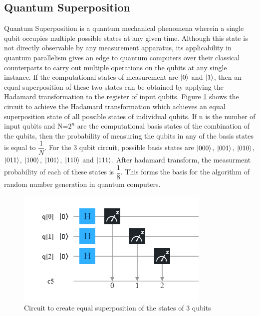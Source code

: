 \documentclass[english,a4paper,11pt,oneside,onecolumn]{book}
\begin{document}
\subsection{Quantum Superposition}
\label{sec:qSupPos}
Quantum Superposition is a quantum mechanical phenomena wherein a single qubit occupies multiple possible states at any given time. Although this state is not directly observable by any measurement apparatus, its applicability in quantum parallelism gives an edge to quantum computers over their classical counterparts to carry out multiple operations on the qubits at any single instance. If the computational states of measurement are \(\ket{0}\) and \(\ket{1}\), then an equal superposition of these two states can be obtained by applying the Hadamard transformation to the register of input qubits. Figure \ref{fig:qSupPos} shows the circuit to achieve the Hadamard transformation which achieves an equal superposition state of all possible states of individual qubits. If n is the number of input qubits and N=\(2^n\) are the computational basis states of the combination of the qubits, then the probability of measuring the qubits in any of the basis states is equal to \(\dfrac{1}{N}\). For the 3 qubit circuit, possible basis states are \(\ket{000}\), \(\ket{001}\), \(\ket{010}\), \(\ket{011}\), \(\ket{100}\), \(\ket{101}\), \(\ket{110}\) and \(\ket{111}\). After hadamard transform, the measurment probability of each of these states is \(\dfrac{1}{8}\). This forms the basis for the algorithm of random number generation in quantum computers.

\begin{figure}[H]
    \centering
    \includegraphics[scale=0.7]{Images/Quantum Superposition.png}
    \caption{Circuit to create equal superposition of the states of 3 qubits}
    \label{fig:qSupPos}
\end{figure}
\end{document}
